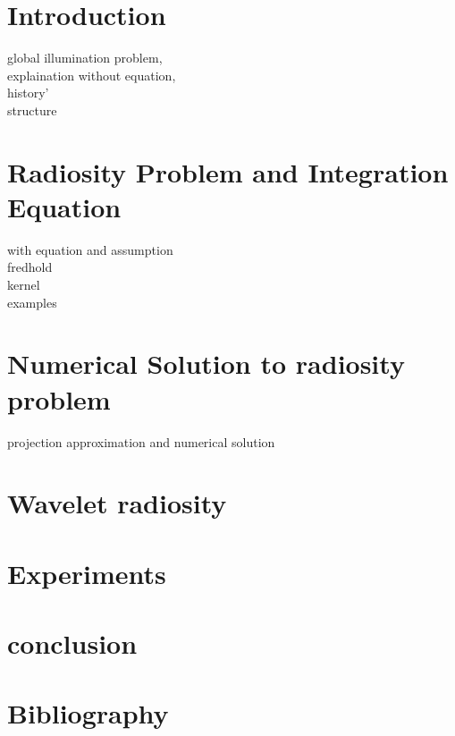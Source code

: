 \documentclass[11pt]{article}
\begin{document}
\section{Introduction}
global illumination problem,\\explaination without equation,\\
 history'\\
 structure
\section{Radiosity Problem and Integration Equation}
with equation and assumption\\
fredhold\\
kernel\\
examples\\


\section{Numerical Solution to radiosity problem}
projection approximation and numerical solution
\section{Wavelet radiosity}

\section{Experiments}
\section{conclusion}
\section{Bibliography}
\end{document}
